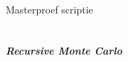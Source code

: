 \begin{titlepage}
    \begin{center}
        \ \
        \ \\
        \ \\
        \ \\
        \ \\
        \ \\
        \ \\
        \ \\
        \ \\
        \ \\
        \ \\
        \ \\
        \Large{M{\sc asterproef scriptie}}
        \ \\
        \ \\
        \ \\
        \huge{\bf{\em Recursive Monte Carlo}}
        \ \\
        \ \\
        \ \\
        \ \\
        \ \\

\end{center}
\end{titlepage}
